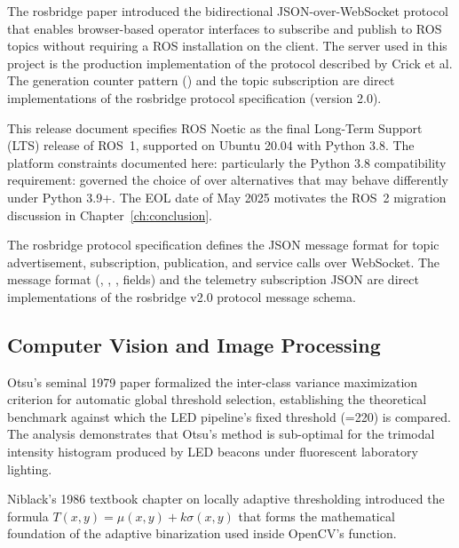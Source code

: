 \textbf{\cite{crick2012rosbridge}} The rosbridge paper introduced the bidirectional JSON-over-WebSocket protocol that enables browser-based operator interfaces to subscribe and publish to ROS topics without requiring a ROS installation on the client. The  server used in this project is the production implementation of the protocol described by Crick et al. The generation counter pattern () and the  topic subscription are direct implementations of the rosbridge protocol specification (version 2.0).

\textbf{\cite{openrobotics2020noetic}} This release document specifies ROS Noetic as the final Long-Term Support (LTS) release of ROS~1, supported on Ubuntu 20.04 with Python 3.8. The platform constraints documented here: particularly the Python 3.8 compatibility requirement: governed the choice of  over alternatives that may behave differently under Python 3.9+. The EOL date of May 2025 motivates the ROS~2 migration discussion in Chapter~\ref{ch:conclusion}.

\textbf{\cite{openrobotics2013rosbridgeproto}} The rosbridge protocol specification defines the JSON message format for topic advertisement, subscription, publication, and service calls over WebSocket. The  message format (, , ,  fields) and the telemetry subscription JSON are direct implementations of the rosbridge v2.0 protocol message schema.

\subsection{Computer Vision and Image Processing}

\textbf{\cite{otsu1979threshold}} Otsu's seminal 1979 paper formalized the inter-class variance maximization criterion for automatic global threshold selection, establishing the theoretical benchmark against which the LED pipeline's fixed threshold (=220) is compared. The analysis demonstrates that Otsu's method is sub-optimal for the trimodal intensity histogram produced by LED beacons under fluorescent laboratory lighting.

\textbf{\cite{niblack1986digital}} Niblack's 1986 textbook chapter on locally adaptive thresholding introduced the formula $T(x,y)=\mu(x,y)+k\sigma(x,y)$ that forms the mathematical foundation of the adaptive binarization used inside OpenCV's  function.

